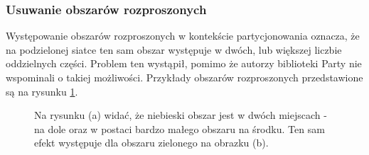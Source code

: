 \subsubsection{Usuwanie obszarów rozproszonych}
Występowanie obszarów rozproszonych w kontekście partycjonowania oznacza, że na podzielonej siatce ten sam obszar
występuje w dwóch, lub większej liczbie oddzielnych części.
Problem ten wystąpił, pomimo że autorzy biblioteki Party nie wspominali o takiej możliwości.
Przykłady obszarów rozproszonych przedstawione są na rysunku \ref{im:noises}.

\begin{figure}[h]
\begin{subfigure}{.5\textwidth}
    \centering
    \caption[short]{}
\end{subfigure}
\begin{subfigure}{.5\textwidth}
    \centering
    \caption[short]{}
\end{subfigure}%
\caption{Na rysunku (a) widać, że niebieski obszar jest w dwóch miejscach - na dole oraz w postaci bardzo małego obszaru na środku.
Ten sam efekt występuje dla obszaru zielonego na obrazku (b).}
\label{im:noises}
\end{figure}

